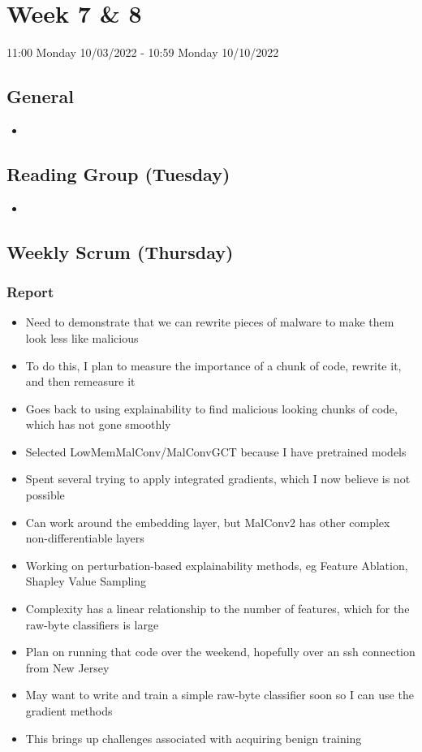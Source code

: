 \documentclass{article}
\begin{document}
\pagebreak


\section*{Week 7 \& 8}
11:00 Monday 10/03/2022 - 10:59 Monday 10/10/2022

\subsection*{General}
\begin{itemize}
	\item 
\end{itemize}

\subsection*{Reading Group (Tuesday)}
\begin{itemize}
	\item 
\end{itemize}

\subsection*{Weekly Scrum (Thursday)}
\subsubsection*{Report}
\begin{itemize}
	\item Need to demonstrate that we can rewrite pieces of malware to make them look less like malicious
	\item To do this, I plan to measure the importance of a chunk of code, rewrite it, and then remeasure it
	\item Goes back to using explainability to find malicious looking chunks of code, which has not gone smoothly
	\item Selected LowMemMalConv/MalConvGCT because I have pretrained models
	\item Spent several trying to apply integrated gradients, which I now believe is not possible
	\item Can work around the embedding layer, but MalConv2 has other complex non-differentiable layers
	\item Working on perturbation-based explainability methods, eg Feature Ablation, Shapley Value Sampling
	\item Complexity has a linear relationship to the number of features, which for the raw-byte classifiers is large
	\item Plan on running that code over the weekend, hopefully over an ssh connection from New Jersey
	\item May want to write and train a simple raw-byte classifier soon so I can use the gradient methods
	\item This brings up challenges associated with acquiring benign training
\end{itemize}
\end{document}
